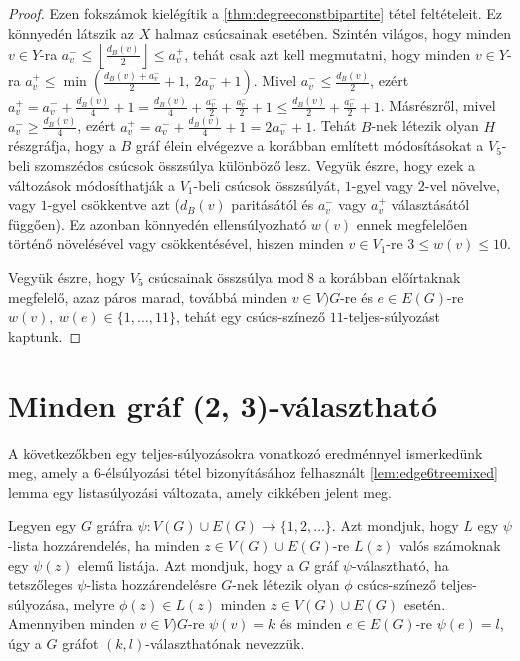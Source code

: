 \documentclass[12pt, a4paper]{report}
\theoremstyle{remark}
\theoremstyle{definition}
\begin{document}
\begin{proof}
Ezen fokszámok kielégítik a \ref{thm:degreeconstbipartite} tétel feltételeit. Ez könnyedén látszik az $X$ halmaz csúcsainak esetében. Szintén világos, hogy minden $v \in Y$-ra $a_v^- \leq \left\lfloor \frac{d_B(v)}{2} \right\rfloor \leq a_v^+$, tehát csak azt kell megmutatni, hogy minden $v \in Y$-ra $a_v^+ \leq \min \left( \frac{d_B(v) + a_v^-}{2} + 1,\ 2a_v^- + 1 \right)$. Mivel $a_v^- \leq \frac{d_B(v)}{2}$, ezért $a_v^+ = a_v^- + \frac{d_B(v)}{4} + 1 = \frac{d_B(v)}{4} + \frac{a_v^-}{2} + \frac{a_v^-}{2} + 1 \leq \frac{d_B(v)}{2} + \frac{a_v^-}{2} + 1$. Másrészről, mivel $a_v^- \geq \frac{d_B(v)}{4}$, ezért $a_v^+ = a_v^- + \frac{d_B(v)}{4} + 1 = 2a_v^- + 1$. Tehát $B$-nek létezik olyan $H$ részgráfja, hogy a $B$ gráf élein elvégezve a korábban említett módosításokat a $V_5$-beli szomszédos csúcsok összsúlya különböző lesz. Vegyük észre, hogy ezek a változások módosíthatják a $V_1$-beli csúcsok összsúlyát, $1$-gyel vagy $2$-vel növelve, vagy $1$-gyel csökkentve azt ($d_B(v)$ paritásától és $a_v^-$ vagy $a_v^+$ választásától függően). Ez azonban könnyedén ellensúlyozható $w(v)$ ennek megfelelően történő növelésével vagy csökkentésével, hiszen minden $v \in V_1$-re $3 \leq w(v) \leq 10$.

Vegyük észre, hogy $V_5$ csúcsainak összsúlya $\mathrm{mod}\ 8$ a korábban előírtaknak megfelelő, azaz páros marad, továbbá minden $v \in V)G$-re és $e \in E(G)$-re $w(v),\ w(e) \in \lbrace 1, \ldots, 11 \rbrace$, tehát egy csúcs-színező $11$-teljes-súlyozást kaptunk.
\end{proof}

\section{Minden gráf (2, 3)-választható}
A következőkben egy teljes-súlyozásokra vonatkozó eredménnyel ismerkedünk meg, amely a $6$-élsúlyozási tétel bizonyításához felhasznált \ref{lem:edge6treemixed} lemma egy listasúlyozási változata, amely \citeauthor{Wong2014} \cite{Wong2014} cikkében jelent meg. 

Legyen egy $G$ gráfra $\psi: V(G) \cup E(G) \rightarrow \lbrace 1, 2, \ldots \rbrace$. Azt mondjuk, hogy $L$ egy $\psi$-lista hozzárendelés, ha minden $z \in V(G) \cup E(G)$-re $L(z)$ valós számoknak egy $\psi(z)$ elemű listája. Azt mondjuk, hogy a $G$ gráf $\psi$-választható, ha tetszőleges $\psi$-lista hozzárendelésre $G$-nek létezik olyan $\phi$ csúcs-színező teljes-súlyozása, melyre $\phi(z) \in L(z)$ minden $z \in V(G) \cup E(G)$ esetén. Amennyiben minden $v \in V)G$-re $\psi(v) = k$ és minden $e \in E(G)$-re $\psi(e) = l$, úgy a $G$ gráfot $(k, l)$-választhatónak nevezzük. 
\end{document}
